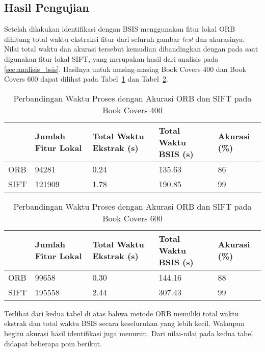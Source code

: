 \subsection{Hasil Pengujian}
Setelah dilakukan identifikasi dengan BSIS menggunakan fitur lokal ORB dihitung total waktu ekstraksi fitur dari seluruh gambar \textit{test} dan akurasinya. Nilai total waktu dan akurasi tersebut kemudian dibandingkan dengan pada saat digunakan fitur lokal SIFT, yang merupakan hasil dari analisis pada \ref{sec:analisis_bsis}. Hasilnya untuk masing-masing Book Covers 400 dan Book Covers 600 dapat dilihat pada Tabel~\ref{tab:hasil_orb_dataset400} dan Tabel~\ref{tab:hasil_orb_dataset600}.
\begin{table}[H]
	\centering
	\begin{tabular}{|p{}|p{}|p{}|p{}|p{}|}
		\hline
		& \textbf{Jumlah Fitur Lokal} & \textbf{Total Waktu Ekstrak (s)} & \textbf{Total Waktu BSIS (s)} & \textbf{Akurasi (\%)} \\ \hline
		ORB  & 94281 & 0.24                             & 135.63                        & 86                    \\ \hline
		SIFT & 121909 & 1.78                             & 190.85                        & 99                    \\ \hline
	\end{tabular}
	\caption{Perbandingan Waktu Proses dengan Akurasi ORB dan SIFT pada Book Covers 400}
	\label{tab:hasil_orb_dataset400}
\end{table}
\begin{table}[H]
	\centering
	\begin{tabular}{|p{}|p{}|p{}|p{}|p{}|}
		\hline
		& \textbf{Jumlah Fitur Lokal} & \textbf{Total Waktu Ekstrak (s)} & \textbf{Total Waktu BSIS (s)} & \textbf{Akurasi (\%)} \\ \hline
		ORB  & 99658 & 0.30                             & 144.16                        & 88                    \\ \hline
		SIFT & 195558 & 2.44                             & 307.43                        & 99                    \\ \hline
	\end{tabular}
	\caption{Perbandingan Waktu Proses dengan Akurasi ORB dan SIFT pada Book Covers 600}
	\label{tab:hasil_orb_dataset600}
\end{table}
Terlihat dari kedua tabel di atas bahwa metode ORB memiliki total waktu ekstrak dan total waktu BSIS secara keseluruhan yang lebih kecil. Walaupun begitu akurasi hasil identifikasi juga menurun. Dari nilai-nilai pada kedua tabel didapat beberapa poin berikut.

